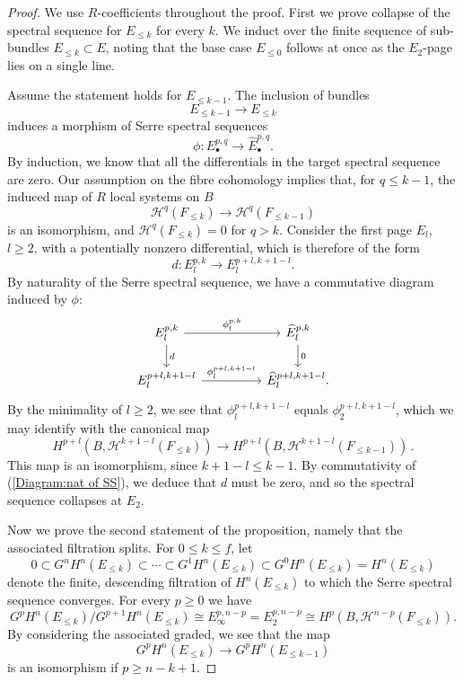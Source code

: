 \documentclass[10pt,a4paper]{amsart}
\begin{document}
\begin{proof}
We use $R$-coefficients throughout the proof. First we prove collapse of the spectral sequence for $E_{\leq k}$ for every $k$. We induct over the finite sequence of sub-bundles $E_{\leq k}\subset E$, noting that the base case $E_{\leq 0}$ follows at once as the $E_2$-page lies on a single line.

Assume the statement holds for $E_{\leq k-1}$. The inclusion of bundles \[E_{\leq k-1}\to E_{\leq k}\] induces a morphism of Serre spectral sequences \[\phi:E^{p,q}_{\bullet}\to \widehat{E}^{p,q}_{\bullet}.\] By induction, we know that all the differentials in the target spectral sequence are zero. Our assumption on the fibre cohomology implies that, for $q\leq k-1$, the induced map of $R$ local systems on $B$ \[\mathcal{H}^q(F_{\leq k})\to \mathcal{H}^q(F_{\leq k-1})\] is an isomorphism, and $\mathcal{H}^q(F_{\leq k})=0$ for $q> k$. Consider the first page $E_l$, $l\geq 2$, with a potentially nonzero differential, which is therefore of the form \[d:E_l^{p,k}\to E_l^{p+l,k+1-l}.\]
By naturality of the Serre spectral sequence, we have a commutative diagram induced by $\phi$:
\begin{equation}\label{Diagram:nat of SS}
    \begin{tikzcd}
E^{p,k}_{l}\arrow[d,"d"]\arrow[rr,"\phi_l^{p,k}"]&& \widehat{E}^{p,k}_{l}\arrow[d,"0"]\\
E^{p+l,k+1-l}_{l}\arrow[rr,"\phi_l^{p+l,k+1-l}"]&& \widehat{E}^{p+l,k+1-l}_{l}.
\end{tikzcd}
\end{equation}
By the minimality of $l\geq 2$, we see that $\phi_l^{p+l,k+1-l}$ equals $\phi_2^{p+l,k+1-l}$, which we may identify with the canonical map
 \[H^{p+l}(B,\mathcal{H}^{k+1-l}(F_{\leq k}))\to H^{p+l}(B,\mathcal{H}^{k+1-l}(F_{\leq k-1}))\, .\]
This map is an isomorphism, since $k+1-l\leq k-1$. By commutativity of (\ref{Diagram:nat of SS}), we deduce that $d$ must be zero, and so the spectral sequence collapses at $E_2$.
 
 
Now we prove the second statement of the proposition, namely that the associated filtration splits. For $0\leq k \leq f$, let
\[
0\subset G^nH^n(E_{\leq k})\subset \cdots \subset G^{1}H^n(E_{\leq k})\subset G^{0}H^n(E_{\leq k})=H^n(E_{\leq k})
\]
denote the finite, descending filtration of $H^n(E_{\leq k})$ to which the Serre spectral sequence converges. For every $p\geq 0$ we have
 \[G^pH^n(E_{\leq k})/G^{p+1}H^n(E_{\leq k})\cong E^{p,n-p}_\infty=E_2^{p,n-p}\cong H^p(B,\mathcal{H}^{n-p}(F_{\leq k})).\]
By considering the associated graded, we see that the map \[G^pH^n(E_{\leq k})\to G^pH^n(E_{\leq k-1})\] is an isomorphism if $p\geq n-k+1$.


\end{proof}
\end{document}
